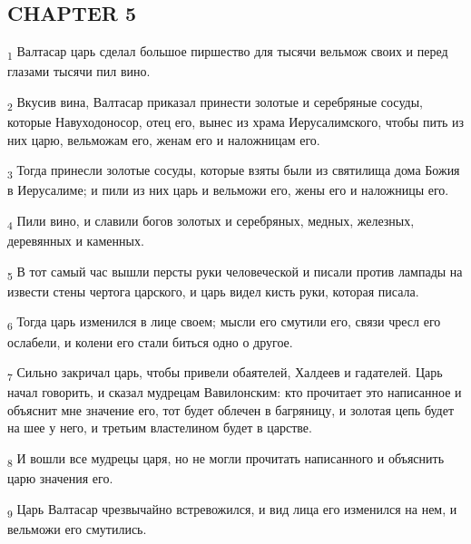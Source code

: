 \subsection{CHAPTER 5}
\begin{tcolorbox}
\textsubscript{1} Валтасар царь сделал большое пиршество для тысячи вельмож своих и перед глазами тысячи пил вино.
\end{tcolorbox}
\begin{tcolorbox}
\textsubscript{2} Вкусив вина, Валтасар приказал принести золотые и серебряные сосуды, которые Навуходоносор, отец его, вынес из храма Иерусалимского, чтобы пить из них царю, вельможам его, женам его и наложницам его.
\end{tcolorbox}
\begin{tcolorbox}
\textsubscript{3} Тогда принесли золотые сосуды, которые взяты были из святилища дома Божия в Иерусалиме; и пили из них царь и вельможи его, жены его и наложницы его.
\end{tcolorbox}
\begin{tcolorbox}
\textsubscript{4} Пили вино, и славили богов золотых и серебряных, медных, железных, деревянных и каменных.
\end{tcolorbox}
\begin{tcolorbox}
\textsubscript{5} В тот самый час вышли персты руки человеческой и писали против лампады на извести стены чертога царского, и царь видел кисть руки, которая писала.
\end{tcolorbox}
\begin{tcolorbox}
\textsubscript{6} Тогда царь изменился в лице своем; мысли его смутили его, связи чресл его ослабели, и колени его стали биться одно о другое.
\end{tcolorbox}
\begin{tcolorbox}
\textsubscript{7} Сильно закричал царь, чтобы привели обаятелей, Халдеев и гадателей. Царь начал говорить, и сказал мудрецам Вавилонским: кто прочитает это написанное и объяснит мне значение его, тот будет облечен в багряницу, и золотая цепь будет на шее у него, и третьим властелином будет в царстве.
\end{tcolorbox}
\begin{tcolorbox}
\textsubscript{8} И вошли все мудрецы царя, но не могли прочитать написанного и объяснить царю значения его.
\end{tcolorbox}
\begin{tcolorbox}
\textsubscript{9} Царь Валтасар чрезвычайно встревожился, и вид лица его изменился на нем, и вельможи его смутились.
\end{tcolorbox}
